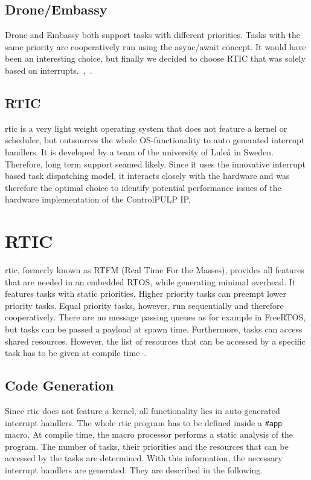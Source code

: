 \subsection{Drone/Embassy}
Drone and Embassy both support tasks with different priorities. Tasks with the same priority are cooperatively run using the async/await concept. It would have been an interesting choice, but finally we decided to choose RTIC that was solely based on interrupts.~\cite{Drone},~\cite{Embassy}.

\subsection{RTIC}
\gls{rtic} is a very light weight operating system that does not feature a kernel or scheduler, but outsources the whole OS-functionality to auto generated interrupt handlers.
It is developed by a team of the university of Luleå in Sweden.
Therefore, long term support seamed likely.
Since it uses the innovative interrupt based task dispatching model, it interacts closely with the hardware and was therefore the optimal choice to identify potential performance issues of the hardware implementation of the ControlPULP IP.

\section{RTIC}
\gls{rtic}, formerly known as RTFM (Real Time For the Masses), provides all features that are needed in an embedded RTOS, while generating minimal overhead.
It features tasks with static priorities. Higher priority tasks can preempt lower priority tasks. Equal priority tasks, however, run sequentially and therefore cooperatively.
There are no message passing queues as for example in FreeRTOS, but tasks can be passed a payload at spawn time.
Furthermore, tasks can access shared resources. However, the list of resources that can be accessed by a specific task has to be given at compile time~\cite{RTIC}. 

\subsection{Code Generation}
Since \gls{rtic} does not feature a kernel, all functionality lies in auto generated interrupt handlers.
The whole \gls{rtic} program has to be defined inside a \texttt{\#app} macro. At compile time, the macro processor performs a static analysis of the program. The number of tasks, their priorities and the resources that can be accessed by the tasks are determined. With this information, the necessary interrupt handlers are generated. They are described in the following.

